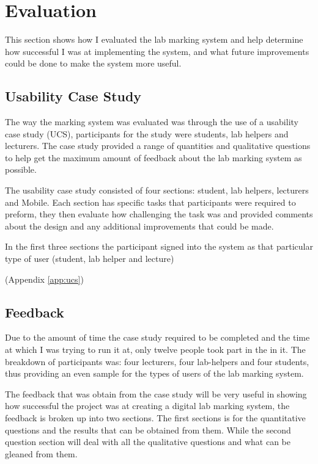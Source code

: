 \documentclass[12pt]{article}  %
\begin{document}
\newpage
\section{Evaluation}

This section shows how I evaluated the lab marking system and help determine how successful I was at implementing the system, and what future improvements could be done to make the system more useful. 

\subsection{Usability Case Study}
The way the marking system was evaluated was through the use of a usability case study (UCS), participants for the study were students, lab helpers and lecturers. The case study provided a range of quantities and qualitative questions to help get the maximum amount of feedback about the lab marking system as possible. 


The usability case study consisted of four sections: student, lab helpers, lecturers and Mobile. Each section has specific tasks that participants were required to preform, they then evaluate how challenging the task was and provided comments about the design and any additional improvements that could be made. 

In the first three sections the participant signed into the system as that particular type of user (student, lab helper and lecture) 



(Appendix \ref{app:ucs})

\subsection{Feedback}

Due to the amount of time the case study required to be completed and the time at which I was trying to run it at, only twelve people took part in the in it. The breakdown of participants was: four lecturers, four lab-helpers and four students, thus providing an even sample for the types of users of the lab marking system.

The feedback that was obtain from the case study will be very useful in showing how successful the project was at creating a digital lab marking system, the feedback is broken up into two sections. The first sections is for the quantitative questions and the results that can be obtained from them. While the second question section will deal with all the qualitative questions and what can be gleaned from them. 
\end{document}
